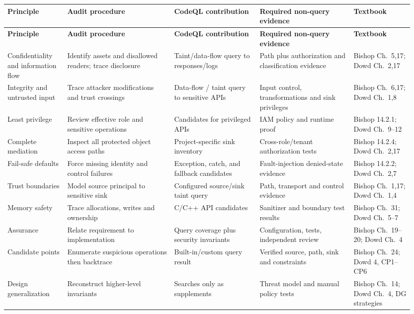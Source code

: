 \documentclass[11pt,letterpaper,oneside]{book}
\begin{document}
\small
\setlength{\tabcolsep}{2pt}
\renewcommand{\arraystretch}{1.18}
\begin{longtable}{>{\raggedright\arraybackslash}p{0.14\linewidth}>{\raggedright\arraybackslash}p{0.25\linewidth}>{\raggedright\arraybackslash}p{0.2\linewidth}>{\raggedright\arraybackslash}p{0.22\linewidth}>{\raggedright\arraybackslash}p{0.14\linewidth}}
\toprule
\textbf{Principle} & \textbf{Audit procedure} & \textbf{CodeQL contribution} & \textbf{Required non-query evidence} & \textbf{Textbook}\\
\midrule
\endfirsthead
\toprule
\textbf{Principle} & \textbf{Audit procedure} & \textbf{CodeQL contribution} & \textbf{Required non-query evidence} & \textbf{Textbook}\\
\midrule
\endhead
Confidentiality and information flow & Identify assets and disallowed readers; trace disclosure & Taint/data-flow query to responses/logs & Path plus authorization and classification evidence & Bishop Ch.~5,17; Dowd Ch.~2,17\\
Integrity and untrusted input & Trace attacker modifications and trust crossings & Data-flow / taint query to sensitive APIs & Input control, transformations and sink privileges & Bishop Ch.~6,17; Dowd Ch.~1,8\\
Least privilege & Review effective role and sensitive operations & Candidates for privileged APIs & IAM policy and runtime proof & Bishop 14.2.1; Dowd Ch.~9--12\\
Complete mediation & Inspect all protected object access paths & Project-specific sink inventory & Cross-role/tenant authorization tests & Bishop 14.2.4; Dowd Ch.~2,17\\
Fail-safe defaults & Force missing identity and control failures & Exception, catch, and fallback candidates & Fault-injection denied-state evidence & Bishop 14.2.2; Dowd Ch.~2,7\\
Trust boundaries & Model source principal to sensitive sink & Configured source/sink taint query & Path, transport and control evidence & Bishop Ch.~1,17; Dowd Ch.~1,4\\
Memory safety & Trace allocations, writes and ownership & C/C++ API candidates & Sanitizer and boundary test results & Bishop Ch.~31; Dowd Ch.~5--7\\
Assurance & Relate requirement to implementation & Query coverage plus security invariants & Configuration, tests, independent review & Bishop Ch.~19--20; Dowd Ch.~4\\
Candidate points & Enumerate suspicious operations then backtrace & Built-in/custom query result & Verified source, path, sink and constraints & Bishop Ch.~24; Dowd 4, CP1--CP6\\
Design generalization & Reconstruct higher-level invariants & Searches only as supplements & Threat model and manual policy tests & Bishop Ch.~14; Dowd Ch.~4, DG strategies\\
\bottomrule
\end{longtable}
\normalsize
\end{document}
